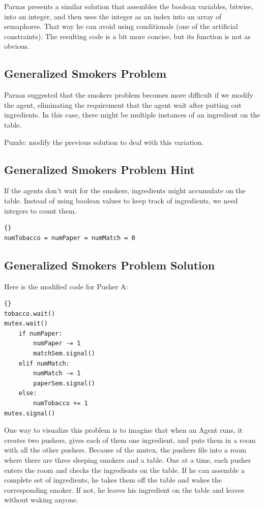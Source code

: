 \documentclass{book}
\begin{document}
Parnas presents a similar solution that assembles the
boolean variables, bitwise, into an integer, and then
uses the integer as an index into an array of semaphores.
That way he can avoid using conditionals (one of the
artificial constraints).  The resulting code is a bit
more concise, but its function is not as obvious.


\subsection{Generalized Smokers Problem}

Parnas suggested that the smokers problem becomes more
difficult if we modify the agent, eliminating the requirement
that the agent wait after putting out ingredients.  In this
case, there might be multiple instances of an ingredient on
the table.

Puzzle: modify the previous solution to deal with this
variation.


\subsection{Generalized Smokers Problem Hint}

If the agents don't wait for the smokers, ingredients might
accumulate on the table.  Instead of using boolean values to
keep track of ingredients, we need integers to count them.

\begin{lstlisting}[title={Generalized Smokers problem hint}]{}
numTobacco = numPaper = numMatch = 0
\end{lstlisting}



\subsection{Generalized Smokers Problem Solution}
\label{smoker}

Here is the modified code for Pusher A:

\begin{lstlisting}[title={Pusher A}]{}
tobacco.wait()
mutex.wait()
    if numPaper:
        numPaper -= 1
        matchSem.signal()
    elif numMatch:
        numMatch -= 1
        paperSem.signal()
    else: 
        numTobacco += 1
mutex.signal()
\end{lstlisting}

One way to visualize this problem is to imagine that when an
Agent runs, it creates two pushers, gives each of them one ingredient,
and puts them in a room with all the other pushers.  Because of the
mutex, the pushers file into a room where there are
three sleeping smokers and a table.  One at a time, each pusher enters
the room and checks the ingredients on the table.  If he can
assemble a complete set of ingredients, he takes them off the table
and wakes the corresponding smoker.  If not, he leaves his ingredient
on the table and leaves without waking anyone.
\end{document}
